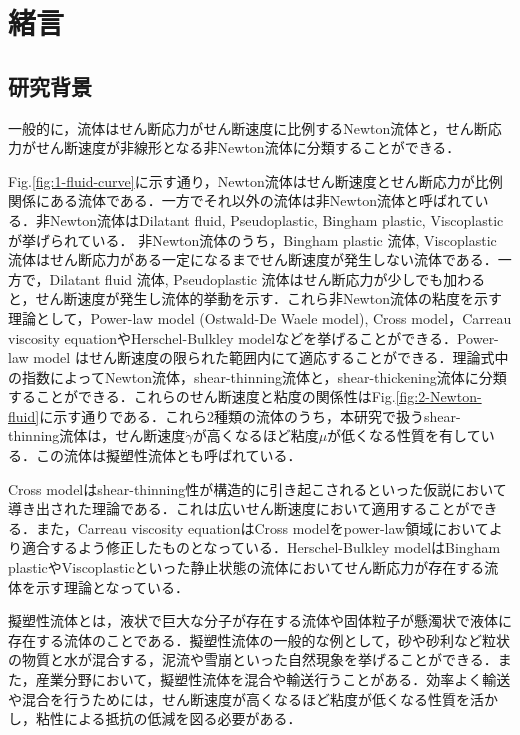 \section{緒言}

\subsection{研究背景}

一般的に，流体はせん断応力がせん断速度に比例するNewton流体と，せん断応力がせん断速度が非線形となる非Newton流体に分類することができる．

Fig.\ref{fig:1-fluid-curve}に示す通り，Newton流体はせん断速度とせん断応力が比例関係にある流体である．一方でそれ以外の流体は非Newton流体と呼ばれている．非Newton流体はDilatant fluid, Pseudoplastic, Bingham plastic, Viscoplastic が挙げられている．
非Newton流体のうち，Bingham plastic 流体, Viscoplastic 流体はせん断応力がある一定になるまでせん断速度が発生しない流体である．一方で，Dilatant fluid 流体, Pseudoplastic 流体はせん断応力が少しでも加わると，せん断速度が発生し流体的挙動を示す．これら非Newton流体の粘度を示す理論として，Power-law model (Ostwald-De Waele model), Cross model，Carreau viscosity equationやHerschel-Bulkley modelなどを挙げることができる\cite{ref:1}．Power-law model はせん断速度の限られた範囲内にて適応することができる．理論式中の指数によってNewton流体，shear-thinning流体と，shear-thickening流体に分類することができる．これらのせん断速度と粘度の関係性はFig.\ref{fig:2-Newton-fluid}に示す通りである．これら2種類の流体のうち，本研究で扱うshear-thinning流体は，せん断速度$\dot{\gamma}$が高くなるほど粘度$\mu$が低くなる性質を有している．この流体は擬塑性流体とも呼ばれている．

Cross modelはshear-thinning性が構造的に引き起こされるといった仮説において導き出された理論である．これは広いせん断速度において適用することができる．また，Carreau viscosity equationはCross modelをpower-law領域においてより適合するよう修正したものとなっている．Herschel-Bulkley modelはBingham plasticやViscoplasticといった静止状態の流体においてせん断応力が存在する流体を示す理論となっている\cite{ref:1}．

擬塑性流体とは，液状で巨大な分子が存在する流体や固体粒子が懸濁状で液体に存在する流体のことである．擬塑性流体の一般的な例として，砂や砂利など粒状の物質と水が混合する，泥流や雪崩といった自然現象を挙げることができる．また，産業分野において，擬塑性流体を混合や輸送行うことがある．効率よく輸送や混合を行うためには，せん断速度が高くなるほど粘度が低くなる性質を活かし，粘性による抵抗の低減を図る必要がある．

